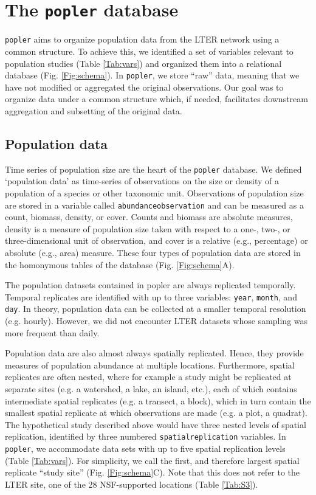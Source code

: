 \documentclass{article}\usepackage[]{graphicx}\usepackage[]{color}
\begin{document}
\section*{The \texttt{popler} database}
\texttt{popler} aims to organize population data from the LTER network using a common structure. To achieve this, we identified a set of variables relevant to population studies (Table \ref{Tab:vars}) and organized them into a relational database (Fig. \ref{Fig:schema}). In \texttt{popler}, we store ``raw'' data, meaning that we have not modified or aggregated the original observations. Our goal was to organize data under a common structure which, if needed, facilitates downstream aggregation and subsetting of the original data.

\subsection*{Population data}
Time series of population size are the heart of the \texttt{popler} database. We defined `population data' as time-series of observations on the size or density of a population of a species or other taxonomic unit. Observations of population size are stored in a variable called \texttt{abundance\textunderscore observation} and can be measured as a count, biomass, density, or cover. Counts and biomass are absolute measures, density is a measure of population size taken with respect to a one-, two-, or three-dimensional unit of observation, and cover is a relative (e.g., percentage) or absolute (e.g., area) measure. These four types of population data are stored in the homonymous tables of the database (Fig. \ref{Fig:schema}A).

The population datasets contained in popler are always replicated temporally. Temporal replicates are identified with up to three variables: \texttt{year}, \texttt{month}, and \texttt{day}. In theory, population data can be collected at a smaller temporal resolution (e.g. hourly). However, we did not encounter LTER datasets whose sampling was more frequent than daily. 

Population data are also almost always spatially replicated. Hence, they provide measures of population abundance at multiple locations. Furthermore, spatial replicates are often nested, where for example a study might be replicated at separate sites (e.g. a watershed, a lake, an island, etc.), each of which contains intermediate spatial replicates (e.g. a transect, a block), which in turn contain the smallest spatial replicate at which observations are made (e.g. a plot, a quadrat). The hypothetical study described above would have three nested levels of spatial replication, identified by three numbered \texttt{spatial\textunderscore replication} variables. In \texttt{popler}, we accommodate data sets with up to five spatial replication levels (Table \ref{Tab:vars}). For simplicity, we call the first, and therefore largest spatial replicate ``study site'' (Fig. \ref{Fig:schema}C). Note that this does not refer to the LTER site, one of the 28 NSF-supported locations (Table \ref{Tab:S3}).
\end{document}
